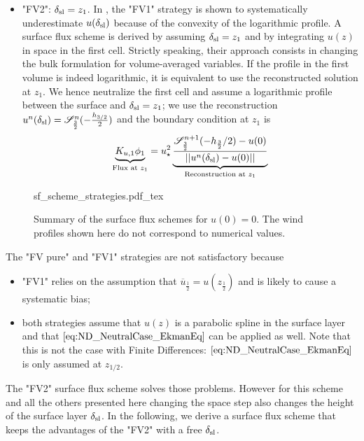 \begin{itemize}
    \item "FV2":  $\delta_{\rm sl} = z_{1}$. In
    \cite{nishizawa_surface_2018}, the "FV1" strategy is shown to systematically
	  underestimate $u(\delta_{\rm sl})$ because of the 
	  convexity of the logarithmic profile.
	A surface flux scheme is derived by assuming
	  $\delta_{\rm sl} = z_1$ and by integrating $u(z)$
	  in space in the first cell.
	Strictly speaking, their approach consists in changing the
	bulk formulation for volume-averaged variables. If the
	profile in the first volume is indeed logarithmic, it
	is equivalent to use the reconstructed solution at
	$z_1$. We hence neutralize the first cell and assume
	a logarithmic profile between the surface and
	$\delta_{\rm sl}=z_1$;
	we use the reconstruction
	$u^n(\delta_{\rm sl}) = {\cal S}^n_{\frac{3}{2}}(
	  -\frac{h_{3/2}}{2})$ and the boundary condition
		  at $z_1$ is
	\begin{equation}
		\underbrace{K_{u,1} \phi_1}_{\text{Flux at } z_1}
		= u_\star^2 
		  \underbrace{\frac{{\cal S}_{\frac{3}{2}}^{n+1}
			(-h_{\frac{3}{2}}/2)-u(0)}
			{||u^n(\delta_{\rm sl})-u(0)||}}_{
				\text{Reconstruction at } z_1
			}
	\end{equation}
	  
  \end{itemize}

\begin{figure}
	\centering
	{sf_scheme_strategies.pdf_tex}
	\caption{Summary of the surface flux schemes for $u(0)=0$.
	The wind profiles shown here do not correspond to
	numerical values.}
	\label{fig:ND_NeutralCase_summary_sfscheme}
\end{figure}

The "FV pure" and "FV1" strategies are not satisfactory because
\begin{itemize}
	\item "FV1" relies on the assumption that
		$\overline{u}_{\frac{1}{2}} = u(z_{\frac{1}{2}})$
		and is likely to cause a systematic bias;
	\item both strategies assume that $u(z)$ is a parabolic spline in the surface layer and that $\eqref{eq:ND_NeutralCase_EkmanEq}$
		can be applied as well. Note that this is not
		the case with Finite Differences:
		$\eqref{eq:ND_NeutralCase_EkmanEq}$ is only assumed
		at $z_{1/2}$.
\end{itemize}
The "FV2" surface flux scheme solves those problems.
However for this scheme and all the others presented here
changing the space step
also changes the height of the surface layer $\delta_{\rm sl}$.
In the following, we derive a surface flux scheme that keeps
the advantages of the "FV2" with a free $\delta_{\rm sl}$.
%
